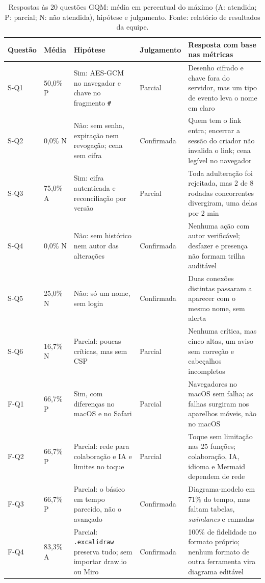\documentclass[conference]{IEEEtran}
\begin{document}
\begin{table}[!t]
\caption{Respostas às 20 questões GQM: média em percentual do máximo (A: atendida; P: parcial; N: não atendida), hipótese e julgamento. Fonte: relatório de resultados da equipe.}
\label{tab:questoes}
\centering
\scriptsize
\setlength{\tabcolsep}{3pt}
\renewcommand{\arraystretch}{0.95}
\begin{tabular}{@{}L{0.95cm} L{1.15cm} L{4.9cm} L{1.5cm} L{7.9cm}@{}}
\toprule
\textbf{Questão} & \textbf{Média} & \textbf{Hipótese} & \textbf{Julgamento} & \textbf{Resposta com base nas métricas}\\
\midrule
S-Q1 & 50,0\% P & Sim: AES-GCM no navegador e chave no fragmento \texttt{\#} & Parcial & Desenho cifrado e chave fora do servidor, mas um tipo de evento leva o nome em claro\\
S-Q2 & 0,0\% N & Não: sem senha, expiração nem revogação; cena sem cifra & Confirmada & Quem tem o link entra; encerrar a sessão do criador não invalida o link; cena legível no navegador\\
S-Q3 & 75,0\% A & Sim: cifra autenticada e reconciliação por versão & Parcial & Toda adulteração foi rejeitada, mas 2 de 8 rodadas concorrentes divergiram, uma delas por 2 min\\
S-Q4 & 0,0\% N & Não: sem histórico nem autor das alterações & Confirmada & Nenhuma ação com autor verificável; desfazer e presença não formam trilha auditável\\
S-Q5 & 25,0\% N & Não: só um nome, sem login & Confirmada & Duas conexões distintas passaram a aparecer com o mesmo nome, sem alerta\\
S-Q6 & 16,7\% N & Parcial: poucas críticas, mas sem CSP & Parcial & Nenhuma crítica, mas cinco altas, um aviso sem correção e cabeçalhos incompletos\\
\midrule
F-Q1 & 66,7\% P & Sim, com diferenças no macOS e no Safari & Parcial & Navegadores no macOS sem falha; as falhas surgiram nos aparelhos móveis, não no macOS\\
F-Q2 & 66,7\% P & Parcial: rede para colaboração e IA e limites no toque & Parcial & Toque sem limitação nas 25 funções; colaboração, IA, idioma e Mermaid dependem de rede\\
F-Q3 & 66,7\% P & Parcial: o básico em tempo parecido, não o avançado & Confirmada & Diagrama-modelo em 71\% do tempo, mas faltam tabelas, \textit{swimlanes} e camadas\\
F-Q4 & 83,3\% A & Parcial: \texttt{.excalidraw} preserva tudo; sem importar draw.io ou Miro & Confirmada & 100\% de fidelidade no formato próprio; nenhum formato de outra ferramenta vira diagrama editável\\

\end{tabular}
\end{table}
\end{document}
